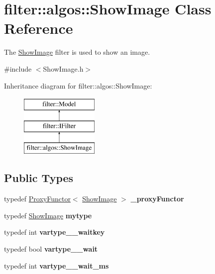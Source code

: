 \hypertarget{classfilter_1_1algos_1_1_show_image}{}\section{filter\+:\+:algos\+:\+:Show\+Image Class Reference}
\label{classfilter_1_1algos_1_1_show_image}


The \hyperlink{classfilter_1_1algos_1_1_show_image}{Show\+Image} filter is used to show an image.  




{\ttfamily \#include $<$Show\+Image.\+h$>$}

Inheritance diagram for filter\+:\+:algos\+:\+:Show\+Image\+:\begin{figure}[H]
\begin{center}
\leavevmode
\includegraphics[height=3.000000cm]{d5/d46/classfilter_1_1algos_1_1_show_image}
\end{center}
\end{figure}
\subsection*{Public Types}
\begin{DoxyCompactItemize}
\item 
\mbox{\label{classfilter_1_1algos_1_1_show_image_a21f24f4f14ed644e68bc87ca11b74981}} 
typedef \hyperlink{class_proxy_functor}{Proxy\+Functor}$<$ \hyperlink{classfilter_1_1algos_1_1_show_image}{Show\+Image} $>$ {\bfseries \+\_\+proxy\+Functor}
\item 
\mbox{\label{classfilter_1_1algos_1_1_show_image_ab034507b821ac8c5274d125fc3922ea4}} 
typedef \hyperlink{classfilter_1_1algos_1_1_show_image}{Show\+Image} {\bfseries mytype}
\item 
\mbox{\label{classfilter_1_1algos_1_1_show_image_ab372c074a501348ee9cf885abfd121db}} 
typedef int {\bfseries vartype\+\_\+\+\_\+waitkey}
\item 
\mbox{\label{classfilter_1_1algos_1_1_show_image_a01fa142ebc244eb5dd2a2cc6910afecc}} 
typedef bool {\bfseries vartype\+\_\+\+\_\+wait}
\item 
\mbox{\label{classfilter_1_1algos_1_1_show_image_ac798a1a1186c917271e6e6cba7a7725f}} 
typedef int {\bfseries vartype\+\_\+\+\_\+wait\+\_\+ms}
\end{DoxyCompactItemize}
